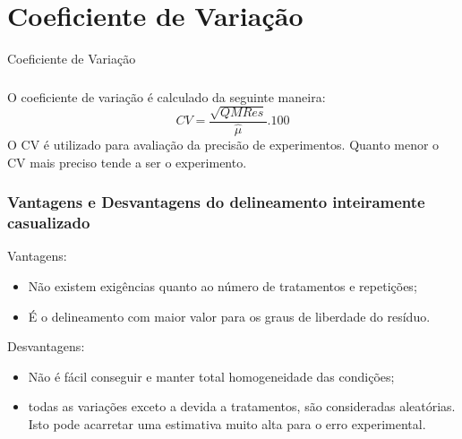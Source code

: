 \documentclass[14pt,aspectratio=1610]{beamer}
\begin{document}
\section{Coeficiente de Variação}
\begin{frame}{Coeficiente de Variação}
\frametitle{}
\begin{block}{}
\justifying
O coeficiente de variação é calculado da seguinte maneira:
$$CV=\dfrac{\sqrt{QMRes}}{\hat{\mu}}.100$$
O CV é utilizado para avaliação da precisão de experimentos. Quanto menor o CV
mais preciso tende a ser o experimento.
\end{block}
\end{frame}

\begin{frame}{}
\frametitle{Vantagens e Desvantagens do delineamento inteiramente casualizado}
\begin{block}{Vantagens:}
\begin{itemize}
\item Não existem exigências quanto ao número de tratamentos e repetições;\pause
\item É o delineamento com maior valor para os graus de liberdade do resíduo.
\end{itemize}
\end{block}
\pause
\begin{block}{Desvantagens:}
\begin{itemize}
\item Não é fácil conseguir e manter total homogeneidade das condições;\pause
\item todas as variações exceto a devida a tratamentos, são consideradas aleatórias. Isto pode acarretar uma estimativa muito alta para o erro experimental.
\end{itemize}
\end{block}
\end{frame}
\end{document}
